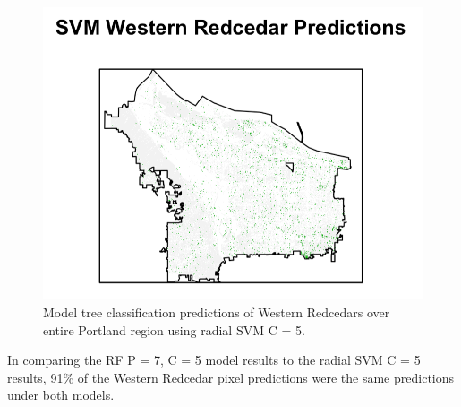 \documentclass[12pt,twoside]{reedthesis}
\begin{document}
\begin{figure}

{\centering \includegraphics[width=1\linewidth]{figure/svmPortland} 

}

\caption{Model tree classification predictions of Western Redcedars over entire Portland region using radial SVM C = 5.}\label{fig:rfPortlandSVM}
\end{figure}
In comparing the RF P = 7, C = 5 model results to the radial SVM C = 5 results, 91\% of the Western Redcedar pixel predictions were the same predictions under both models.
\end{document}
